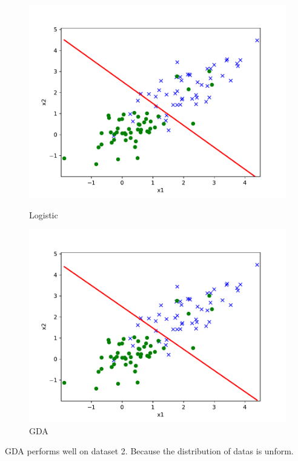 \begin{answer}
		\begin{figure}[H]
		\centering
		\begin{minipage}[b]{0.46\linewidth}
			\centering
			\includegraphics[width=\linewidth]{ds2.pdf}
			\caption{Logistic}%
		\end{minipage}
		\begin{minipage}[b]{0.46\linewidth}
			\centering
			\includegraphics[width=\linewidth]{ds2_gda.pdf}
			\caption{GDA}%
		\end{minipage}
	\end{figure}
	GDA performs well on dataset 2. Because the distribution of datas is unform.
\end{answer}
